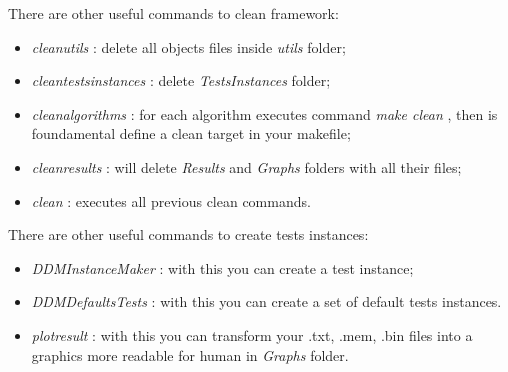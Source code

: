 \documentclass[a4paper,11pt]{report}
\newcommand{\folder}[1]{
  \textcolor{foldercolor}{\textit{#1}}
}
\newcommand{\command}[1]{
  \textcolor{commandcolor}{\textit{#1}}
}
\begin{document}
 There are other useful commands to clean framework:
 \begin{itemize}
  \item \command{cleanutils}: delete all objects files inside \folder{utils} folder;
  \item \command{cleantestsinstances}: delete \folder{TestsInstances} folder;
  \item \command{cleanalgorithms}: for each algorithm executes command \command{make clean}, 
  then is foundamental define a clean target in your makefile;
  \item \command{cleanresults}: will delete \folder{Results} and \folder{Graphs} folders 
  with all their files;
  \item \command{clean}: executes all previous clean commands.
 \end{itemize}
 
 There are other useful commands to create tests instances:
 \begin{itemize}
  \item \command{DDMInstanceMaker}: with this you can create a test instance;
  \item \command{DDMDefaultsTests}: with this you can create a set of default tests instances.
  \item \command{plotresult}: with this you can transform your .txt, .mem, .bin files into a graphics more
  readable for human in \folder{Graphs} folder.
 \end{itemize}

 
\end{document}
